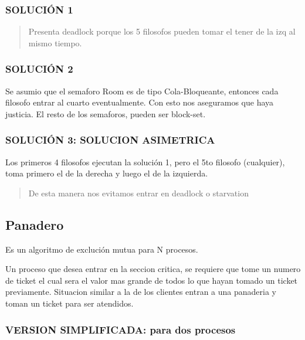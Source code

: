 \documentclass{article}
\begin{document}
\subsubsection{SOLUCIÓN 1}



\begin{quote}
    Presenta deadlock porque los 5 filosofos pueden tomar el tener de la izq al mismo tiempo.
\end{quote}

\newpage
\subsubsection{SOLUCIÓN 2}



Se asumio que el semaforo Room es de tipo Cola-Bloqueante, entonces cada filosofo entrar al cuarto eventualmente. Con esto nos aseguramos que haya justicia.
El resto de los semaforos, pueden ser block-set.

\subsubsection{SOLUCIÓN 3: SOLUCION ASIMETRICA}

Los primeros 4 filosofos ejecutan la solución 1, pero el 5to filosofo (cualquier), toma primero el de la derecha y luego el de la izquierda.



\begin{quote}
    De esta manera nos evitamos entrar en deadlock o starvation
\end{quote}

\newpage
\subsection{Panadero}
Es un algoritmo de exclución mutua para N procesos.

Un proceso que desea entrar en la seccion critica, se requiere que tome un numero de ticket el cual sera el valor mas grande de todos lo que hayan tomado un ticket previamente. 
Situacion similar a la de los clientes entran a una panaderia y toman un ticket para ser atendidos.

\subsubsection{VERSION SIMPLIFICADA: para dos procesos}
\end{document}
